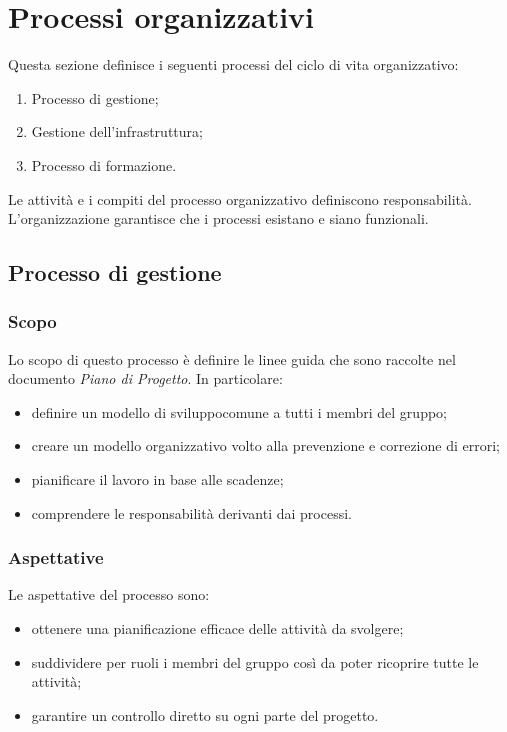 \section{Processi organizzativi}
	Questa sezione definisce i seguenti processi del ciclo di vita organizzativo:
	\begin{enumerate}
		\item Processo di gestione;
		\item Gestione dell'infrastruttura;
		\item Processo di formazione.
	\end{enumerate}
	Le attività e i compiti del processo organizzativo definiscono responsabilità. L'organizzazione garantisce che i processi esistano e siano funzionali.
	
	
	\subsection{Processo di gestione}
		\subsubsection{Scopo}

		Lo scopo di questo processo è definire le linee guida che sono raccolte nel documento \textit{Piano di Progetto}. In particolare:
		\begin{itemize}
			\item definire un modello di sviluppo\glosp comune a tutti i membri del gruppo; 
			\item creare un modello organizzativo volto alla prevenzione e correzione di errori;
			\item pianificare il lavoro in base alle scadenze;
			\item comprendere le responsabilità derivanti dai processi.
		\end{itemize}

		\subsubsection{Aspettative}
		Le aspettative del processo sono:
		\begin{itemize}
			\item ottenere una pianificazione efficace delle attività da svolgere;
			\item suddividere per ruoli i membri del gruppo così da poter ricoprire tutte le attività;
			\item garantire un controllo diretto su ogni parte del progetto.
		\end{itemize}
		
